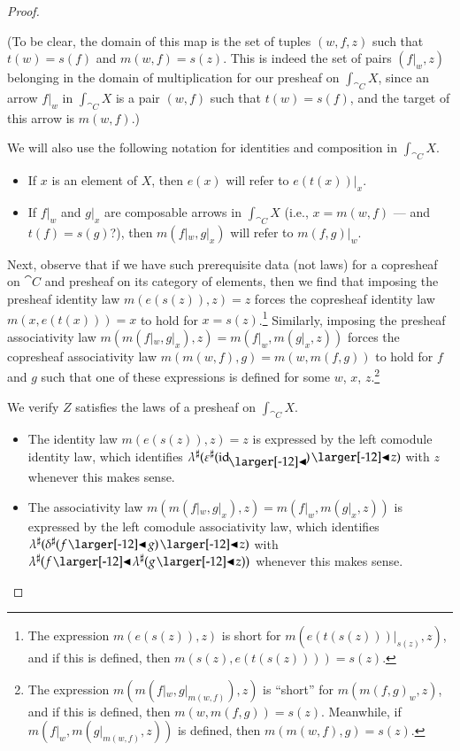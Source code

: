 \documentclass{amsart}
\begin{document}
\begin{proof}
\begin{itemize}
    (To be clear, the domain of this map is the set of tuples
    $(w, f, z)$ such that $t(w) = s(f)$ and $m(w, f) = s(z)$. This is
    indeed the set of pairs $(f|_w, z)$ belonging in the domain of
    multiplication for our presheaf on $\int_{\cat{C}}X$, since an arrow
    $f|_w$ in $\int_{\cat{C}}X$ is a pair $(w, f)$ such that
    $t(w) = s(f)$, and the target of this arrow is $m(w, f)$.)
  \end{itemize}

  We will also use the following notation for identities and
  composition in $\int_{\cat{C}}X$.
  \begin{itemize}
  \item If $x$ is an element of $X$, then $e(x)$ will refer to
    $e(t(x))|_x$.
  \item If $f|_w$ and $g|_x$ are composable arrows in $\int_{\cat{C}}X$
    (i.e., $x = m(w,f)$ --- and $t(f) = s(g)$?), then $m(f|_w, g|_x)$ will refer to
    $m(f, g)|_w$.
  \end{itemize}

  Next, observe that if we have such prerequisite data (not laws) for
  a copresheaf on $\cat{C}$ and presheaf on its category of elements,
  then we find that imposing the presheaf identity law
  $m(e(s(z)), z) = z$ forces the copresheaf identity law
  $m(x, e(t(x))) = x$ to hold for $x = s(z)$.\footnote{The expression
    $m(e(s(z)), z)$ is short for $m(e(t(s(z)))|_{s(z)},z)$, and if
    this is defined, then $m(s(z), e(t(s(z)))) = s(z)$.} Similarly,
  imposing the presheaf associativity law
  $m(m(f|_w, g|_x), z) = m(f|_w, m(g|_x, z))$ forces the copresheaf
  associativity law $m(m(w, f), g) = m(w, m(f, g))$ to hold for
  $f$ and $g$ such that one of these expressions is defined for some
  $w$, $x$, $z$.\footnote{The expression
    $m(m(f|_w, g|_{m(w, f)}), z)$ is ``short'' for $m(m(f, g)_w, z)$,
    and if this is defined, then $m(w, m(f, g)) = s(z)$. Meanwhile, if
    $m(f|_w, m(g|_{m(w, f)}, z))$ is defined, then
    $m(m(w, f), g) = s(z)$.}
  
  We verify $Z$ satisfies the laws of a presheaf on $\int_{\cat{C}}X$.
  \begin{itemize}
  \item The identity law $m(e(s(z)), z) = z$ is
    expressed by the left comodule identity law, which identifies
    ${\anydirmap{\lambda}{\anydirmap{\varepsilon}{\idsubd} \subd z}}$ with
    $z$ whenever this makes sense.
  \item The associativity law
    $m(m(f|_w, g|_x), z) = m(f|_w, m(g|_x, z))$ is
    expressed by the left comodule associativity law, which identifies
    ${\anydirmap{\lambda}{\anydirmap{\delta}{f \subd g} \subd z}}$
    with
    ${\anydirmap{\lambda}{f \subd \anydirmap{\lambda}{g \subd z}}}$
    whenever this makes sense.
  \end{itemize}


\end{proof}
\end{document}
